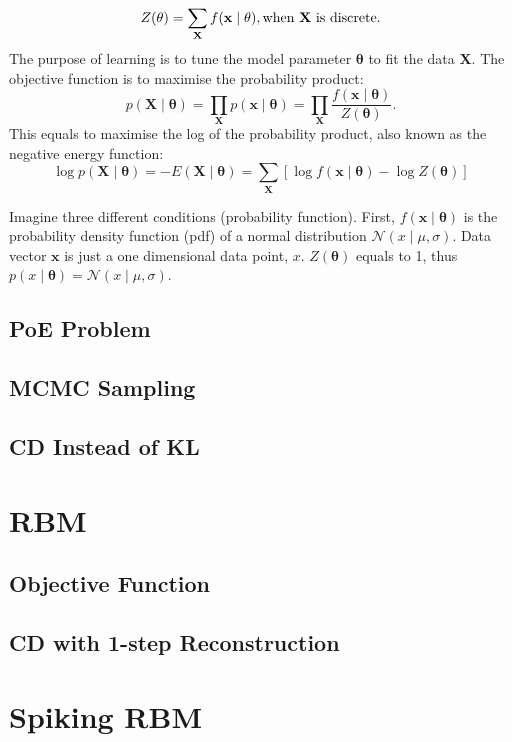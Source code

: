 \documentclass[11pt,twoside,a4paper]{article}
\begin{document}
\begin{equation}
Z( \mathbf{\theta}) = \sum_\mathbf{X} f(\mathbf{x} \mid \mathbf{\theta} ), \text{when  $ \mathbf{X} $ is discrete.}
\end{equation}
The purpose of learning is to tune the model parameter $ \mathbf{\theta} $ to fit the data $ \mathbf{X}  $. 
The objective function is to maximise the probability product:
\begin{equation}
 p(\mathbf{X} \mid \mathbf{\theta} ) = \prod_\mathbf{X} p(\mathbf{x} \mid \mathbf{\theta} ) =  \prod_\mathbf{X}\dfrac{f(\mathbf{x} \mid \mathbf{\theta} )}{Z( \mathbf{\theta})}.
\end{equation}
 This equals to maximise the log of the probability product, also known as the negative energy function:
\begin{equation}
  \log p(\mathbf{X} \mid \mathbf{\theta} ) = -E(\mathbf{X} \mid \mathbf{\theta} )  =  \sum_\mathbf{X}[\log f(\mathbf{x} \mid \mathbf{\theta} ) - \log Z( \mathbf{\theta})] 
\end{equation}

Imagine three different conditions (probability function).
First, $f(\mathbf{x} \mid \mathbf{\theta} )$ is the probability density function (pdf) of a normal distribution $\mathcal{N}(x \mid \mu, \sigma )$.
Data vector $ \mathbf{x} $ is just a one dimensional data point, $x$.
$ Z( \mathbf{\theta}) $ equals to 1, thus $p(x \mid \mathbf{\theta} ) = \mathcal{N}(x \mid \mu, \sigma )$.
\subsection{PoE Problem}
\subsection{MCMC Sampling}
\subsection{CD Instead of KL}
\section{RBM\cite{zhang2013rbm}}
\subsection{Objective Function}
\subsection{CD with 1-step Reconstruction}
\section{Spiking RBM\cite{neftci2013event}}

 

\end{document}

